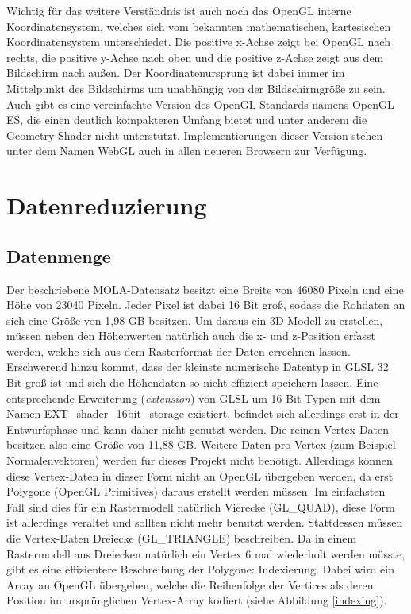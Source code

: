 Wichtig für das weitere Verständnis ist auch noch das OpenGL interne Koordinatensystem, welches sich vom bekannten mathematischen, kartesischen Koordinatensystem unterschiedet. Die positive x-Achse zeigt bei OpenGL nach rechts, die positive y-Achse nach oben und die positive z-Achse zeigt aus dem Bildschirm nach außen. Der Koordinatenursprung ist dabei immer im Mittelpunkt des Bildschirms um unabhängig von der Bildschirmgröße zu sein. Auch gibt es eine vereinfachte Version des OpenGL Standards namens OpenGL ES, die einen deutlich kompakteren Umfang bietet und unter anderem die Geometry-Shader nicht unterstützt. Implementierungen dieser Version stehen unter dem Namen WebGL auch in allen neueren Browsern zur Verfügung.

\section{Datenreduzierung}\label{datenreduzierung}

\subsection{Datenmenge}\label{datenmenge}
Der beschriebene MOLA-Datensatz besitzt eine Breite von 46080 Pixeln und eine Höhe von 23040 Pixeln. Jeder Pixel ist dabei 16 Bit groß, sodass die Rohdaten an sich eine Größe von 1,98 GB besitzen\cite{molaDataExtended}. Um daraus ein 3D-Modell zu erstellen, müssen neben den Höhenwerten natürlich auch die x- und z-Position erfasst werden, welche sich aus dem Rasterformat der Daten errechnen lassen. Erschwerend hinzu kommt, dass der kleinste numerische Datentyp in GLSL 32 Bit groß ist\cite[Abschnitt 4.1]{glslSpec} und sich die Höhendaten so nicht effizient speichern lassen. Eine entsprechende Erweiterung (\textit{extension}) von GLSL um 16 Bit Typen mit dem Namen EXT\_shader\_16bit\_storage existiert, befindet sich allerdings erst in der Entwurfsphase und kann daher nicht genutzt werden. Die reinen Vertex-Daten besitzen also eine Größe von 11,88 GB. Weitere Daten pro Vertex (zum Beispiel Normalenvektoren) werden für dieses Projekt nicht benötigt. Allerdings können diese Vertex-Daten in dieser Form nicht an OpenGL übergeben werden, da erst Polygone (OpenGL Primitives) daraus erstellt werden müssen. Im einfachsten Fall sind dies für ein Rastermodell natürlich Vierecke (GL\_QUAD), diese Form ist allerdings veraltet und sollten nicht mehr benutzt werden. Stattdessen müssen die Vertex-Daten  Dreiecke (GL\_TRIANGLE) beschreiben. Da in einem Rastermodell aus Dreiecken natürlich ein Vertex 6 mal wiederholt werden müsste, gibt es eine effizientere Beschreibung der Polygone: Indexierung. Dabei wird ein Array an OpenGL übergeben, welche die Reihenfolge der Vertices als deren Position im ursprünglichen Vertex-Array kodiert (siehe Abbildung \ref{indexing}). 

